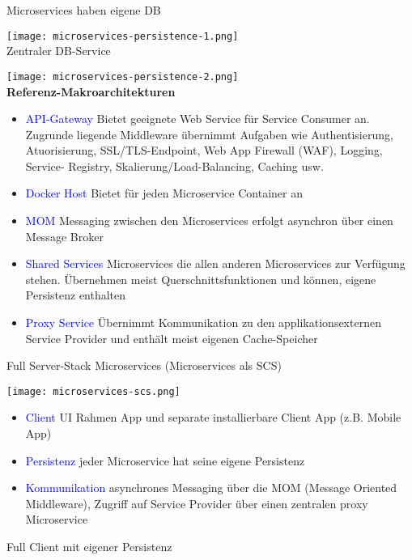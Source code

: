 Microservices haben eigene DB

\texttt{[image: microservices-persistence-1.png]} \\

Zentraler DB-Service

\texttt{[image: microservices-persistence-2.png]} \\

\textbf{Referenz-Makroarchitekturen}

\begin{itemize}
    \item \textcolor{blue}{API-Gateway} Bietet geeignete Web Service für Service Consumer an. Zugrunde liegende Middleware übernimmt Aufgaben wie Authentisierung, Atuorisierung, SSL/TLS-Endpoint, Web App Firewall (WAF), Logging, Service-
        Registry, Skalierung/Load-Balancing, Caching usw.
    \item \textcolor{blue}{Docker Host} Bietet für jeden Microservice Container an
    \item \textcolor{blue}{MOM} Messaging zwischen den Microservices erfolgt asynchron über einen Message Broker
    \item \textcolor{blue}{Shared Services} Microservices die allen anderen Microservices zur Verfügung stehen. Übernehmen meist Querschnittsfunktionen und können, eigene Persistenz enthalten
    \item \textcolor{blue}{Proxy Service} Übernimmt Kommunikation zu den applikationsexternen Service Provider und enthält meist eigenen Cache-Speicher
\end{itemize}

Full Server-Stack Microservices (Microservices als SCS)

\texttt{[image: microservices-scs.png]}

\begin{itemize}
    \item \textcolor{blue}{Client} UI Rahmen App und separate installierbare Client App (z.B. Mobile App)
    \item \textcolor{blue}{Persistenz} jeder Microservice hat seine eigene Persistenz
    \item \textcolor{blue}{Kommunikation} asynchrones Messaging über die MOM (Message Oriented Middleware), Zugriff auf Service Provider über einen zentralen proxy Microservice
\end{itemize}
\vspace{10pt}
Full Client mit eigener Persistenz

